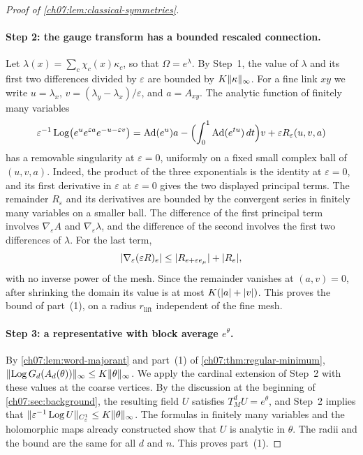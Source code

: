 \begin{proof}[Proof of \cref{ch07:lem:classical-symmetries}]
\paragraph{Step 2: the gauge transform has a bounded rescaled connection.}
Let $\lambda(x)=\sum_c\chi_c(x)\kappa_c$, so that $\Omega=e^\lambda$. By Step~1, the value of $\lambda$ and its first two differences divided by $\varepsilon$ are bounded by $K\lVert \kappa\rVert_\infty$. For a fine link $xy$ we write $u=\lambda_x$, $v=(\lambda_y-\lambda_x)/\varepsilon$, and $a=A_{xy}$. The analytic function of finitely many variables
\[
 \varepsilon^{-1}\operatorname{Log}\bigl(e^ue^{\varepsilon a}e^{-u-\varepsilon v}\bigr)
 =\operatorname{Ad}(e^u)a-\Bigl(\int_0^1\operatorname{Ad}(e^{tu})\,dt\Bigr)v+\varepsilon R_\varepsilon(u,v,a)
\]
has a removable singularity at $\varepsilon=0$, uniformly on a fixed small complex ball of $(u,v,a)$. Indeed, the product of the three exponentials is the identity at $\varepsilon=0$, and its first derivative in $\varepsilon$ at $\varepsilon=0$ gives the two displayed principal terms. The remainder $R_\varepsilon$ and its derivatives are bounded by the convergent series in finitely many variables on a smaller ball. The difference of the first principal term involves $\nabla_\varepsilon A$ and $\nabla_\varepsilon\lambda$, and the difference of the second involves the first two differences of $\lambda$. For the last term,
\[
 \lvert \nabla_\varepsilon(\varepsilon R)_e\rvert\le\lvert R_{e+\varepsilon e_\mu}\rvert+\lvert R_e\rvert,
\]
with no inverse power of the mesh. Since the remainder vanishes at $(a,v)=0$, after shrinking the domain its value is at most $K(\lvert a\rvert+\lvert v\rvert)$. This proves the bound of part~(1), on a radius $r_{\mathrm{lift}}$ independent of the fine mesh.

\paragraph{Step 3: a representative with block average $e^\theta$.}
By \cref{ch07:lem:word-majorant} and part~(1) of \cref{ch07:thm:regular-minimum}, $\lVert \operatorname{Log} G_d(A_d(\theta))\rVert_\infty\le K\lVert \theta\rVert_\infty$. We apply the cardinal extension of Step~2 with these values at the coarse vertices. By the discussion at the beginning of \cref{ch07:sec:background}, the resulting field $U$ satisfies $T_M^dU=e^\theta$, and Step~2 implies that $\lVert \varepsilon^{-1}\operatorname{Log} U\rVert_{C^1_\varepsilon}\le K\lVert \theta\rVert_\infty$. The formulas in finitely many variables and the holomorphic maps already constructed show that $U$ is analytic in $\theta$. The radii and the bound are the same for all $d$ and $n$. This proves part~(1).


\end{proof}
